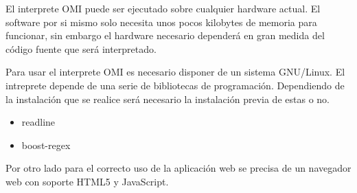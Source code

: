 El interprete OMI puede ser ejecutado sobre cualquier hardware actual. El software por si mismo
solo necesita unos pocos kilobytes de memoria para funcionar, sin embargo el hardware 
necesario dependerá en gran medida del código fuente que será interpretado.

Para usar el interprete OMI es necesario disponer de un sistema GNU/Linux. 
El intreprete depende de una serie de bibliotecas de programación. Dependiendo 
de la instalación que se realice será necesario la instalación previa de estas o no.

\begin{itemize}
\item readline
\item boost-regex
\end{itemize}

Por otro lado para el correcto uso de la aplicación web se precisa de un navegador web con soporte 
HTML5 y JavaScript.
